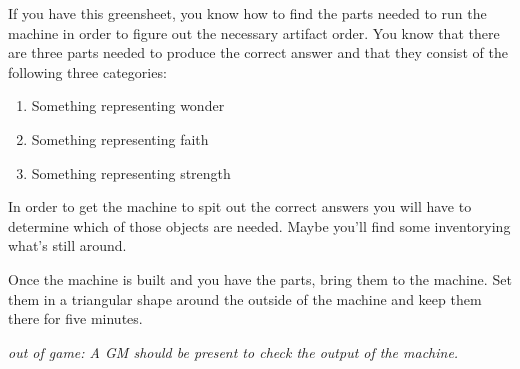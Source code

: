 \documentclass[green]{guildcamp3}
\begin{document}
\name{\gAddPartsMagic{}}


If you have this greensheet, you know how to find the parts needed to run the machine in order to figure out the necessary artifact order. You know that there are three parts needed to produce the correct answer and that they consist of the following three categories:

\begin{enumerate}
	\item Something representing wonder
	\item Something representing faith
	\item Something representing strength
\end{enumerate}

In order to get the machine to spit out the correct answers you will have to determine which of those objects are needed. Maybe you'll find some inventorying what's still around. 

Once the machine is built and you have the parts, bring them to the machine. Set them in a triangular shape around the outside of the machine and keep them there for five minutes. 

\emph{out of game: A GM should be present to check the output of the machine.}

\end{document}
